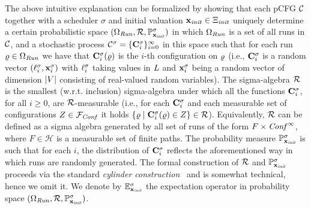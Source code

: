The above intuitive explanation can be formalized by showing that
each pCFG $\mathcal{C}$ together with a scheduler $\sigma$ and initial valuation 
$\mathbf{x}_{\mathit{init}}\in \Xi_{\mathit{init}}$ uniquely determine a 
certain 
probabilistic 
space $(\Omega_{\mathit{Run}},\mathcal{R},\mathbb{P}^{\sigma}_{\mathbf{x}_{\mathit{init}}})$ in which $\Omega_{\mathit{Run}}$ 
is a set of 
all 
runs in $\mathcal{C}$, and a stochastic process 
$\mathcal{C}^{\sigma}=\{\mathbf{C}^{\sigma}_{i}\}_{i=0}^{\infty}$ in this space 
such 
that for each run $\varrho\in \Omega_{\mathit{Run}}$ we have that $\mathbf{C}^{\sigma}_{i}(\varrho)$ is 
the 
$i$-th configuration on $\varrho$ (i.e., $\mathbf{C}^{\sigma}_{i}$ is a random vector 
$(\ell^{\sigma}_{i},\mathbf{x}^{\sigma}_{i})$ with  $\ell^{\sigma}_{i}$ taking 
values in $\mathit{L}$ and $\mathbf{x}^{\sigma}_{i}$ being a random vector of dimension 
$|V|$ consisting of real-valued random variables). The sigma-algebra 
$\mathcal{R}$ is the smallest (w.r.t. inclusion) sigma-algebra under which all 
the functions $\mathbf{C}^{\sigma}_{i}$, for all $i\geq 0$, 
are $\mathcal{R}$-measurable (i.e., for each $\mathbf{C}^{\sigma}_{i}$ and each measurable 
set of configurations $Z\in\mathcal{F}_{\mathit{Conf}}$ it holds 
$\{\varrho\mid\mathbf{C}^{\sigma}_{i}(\varrho)\in Z\}\in \mathcal{R}$). Equivalently, 
$\mathcal{R}$ can be defined as a sigma algebra generated by all set of runs of 
the form $F\times \mathit{Conf}^{\infty}$, where $F\in \mathcal{H}$ is a measurable set 
of finite paths. The 
probability 
measure 
$\mathbb{P}^{\sigma}_{\mathbf{x}_{\mathit{init}}}$ is such that for each $i$, the distribution of 
$\mathbf{C}^{\sigma}_{i}$ reflects the aforementioned way in which runs are randomly 
generated. The formal construction 
of $\mathcal{R}$ and $\mathbb{P}^{\sigma}_{\mathbf{x}_{\mathit{init}}}$ proceeds via the standard 
\emph{cylinder 
construction}~\cite[Theorem 2.7.2]{Ash:book} and is
somewhat 
technical, hence we omit it. 
We denote by $\mathbb{E}^\sigma_{\mathbf{x}_{\mathit{init}}}$ the expectation operator in probability 
space 
$(\Omega_{\mathit{Run}},\mathcal{R},\mathbb{P}^{\sigma}_{\mathbf{x}_{\mathit{init}}})$.
 

%


